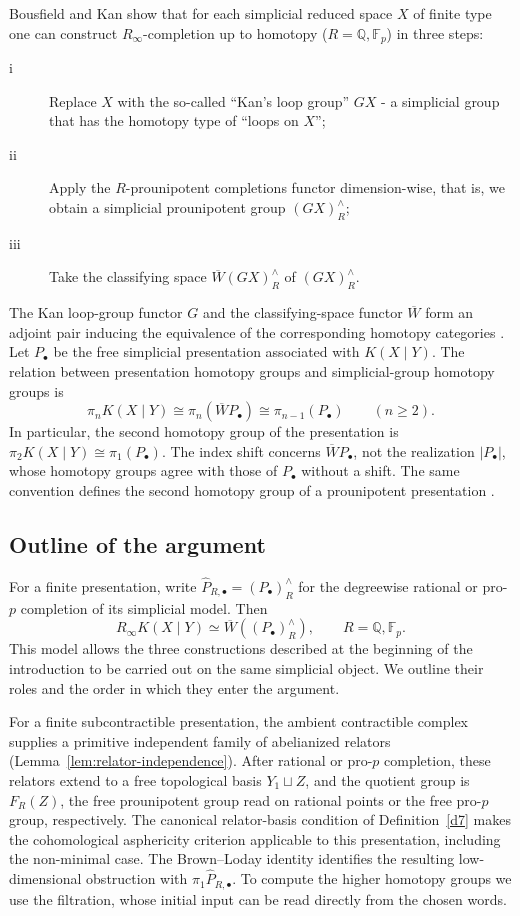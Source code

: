 \documentclass[11pt,a4paper]{article}
\begin{document}
Bousfield and Kan show \cite[Proposition 4.1]{BK} that for each simplicial reduced space $X$ of finite type one can construct $R_{\infty}$-completion up to homotopy ($R=\mathbb{Q},\mathbb{F}_p$) in three steps:
\begin{description}
\item[i]{Replace $X$ with the so-called ``Kan's loop group'' $GX$ \cite[p.276]{GJ} - a simplicial group that has the homotopy type of ``loops on $X$'';}
\item[ii]{Apply the $R$-prounipotent completions functor dimension-wise, that is, we obtain a simplicial prounipotent group $(GX)^{\wedge}_R$;}
\item[iii]{Take the classifying space $\overline{W}(GX)^{\wedge}_R$ of $(GX)^{\wedge}_R$.}
\end{description}

The Kan loop-group functor $G$ and the classifying-space functor
$\overline W$ form an adjoint pair inducing the equivalence of the
corresponding homotopy categories \cite[Chapter~V, Proposition~6.3]{GJ}.
Let $P_\bullet$ be the free simplicial presentation associated with
$K(X\mid Y)$.  The relation between presentation homotopy groups and
simplicial-group homotopy groups is
\[
 \pi_n K(X\mid Y)\cong\pi_n(\overline WP_\bullet)
 \cong\pi_{n-1}(P_\bullet)\qquad(n\geq2).
\]
In particular, the second homotopy group of the presentation is
$\pi_2K(X\mid Y)\cong\pi_1(P_\bullet)$.  The index shift concerns
$\overline WP_\bullet$, not the realization $|P_\bullet|$, whose homotopy
groups agree with those of $P_\bullet$ without a shift.  The same
convention defines the second homotopy group of a prounipotent
presentation \cite[Section~4.5]{Mikh2023}.

\subsection{Outline of the argument}\label{intro:strategy}
For a finite presentation, write
$\widehat P_{R,\bullet}=(P_\bullet)^{\wedge}_R$ for the degreewise
rational or pro-$p$ completion of its simplicial model.  Then
\[
 R_\infty K(X\mid Y)\simeq\overline W((P_\bullet)^{\wedge}_R),
 \qquad R=\mathbb Q,\mathbb F_p.
\]
This model allows the three constructions described at the beginning
of the introduction to be carried out on the same simplicial object.
We outline their roles and the order in which they enter the argument.

For a finite subcontractible presentation, the ambient contractible
complex supplies a primitive independent family of abelianized
relators (Lemma~\ref{lem:relator-independence}).  After rational or
pro-$p$ completion, these relators extend to a free topological basis
$Y_1\sqcup Z$, and the quotient group is $F_R(Z)$, the free
prounipotent group read on rational points or the free pro-$p$ group,
respectively.  The canonical
relator-basis condition of Definition~\ref{d7} makes the cohomological
asphericity criterion applicable to this presentation, including the
non-minimal case.  The Brown--Loday identity identifies the resulting
low-dimensional obstruction with $\pi_1\widehat P_{R,\bullet}$.
To compute the higher homotopy groups we use the filtration, whose
initial input can be read directly from the chosen words.
\end{document}
